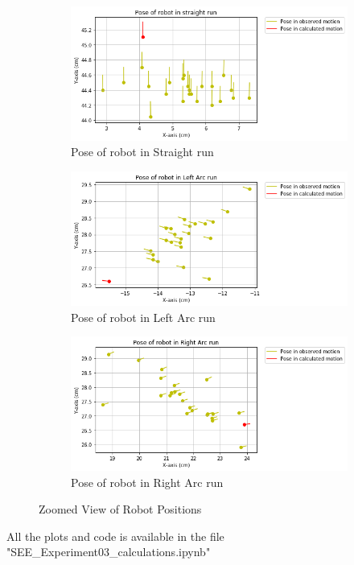 \documentclass[10pt,a4paper]{article}
\begin{document}
					 \begin{figure}[H]
						 	\begin{subfigure}{0.5\textwidth}
						 		\centering
						 		\includegraphics[width=0.8\linewidth]{img/scatter_plot_st.png}
						 		\caption{Pose of robot in Straight run}
						 	\end{subfigure}
						 	\hfill
						 	\begin{subfigure}{0.5\textwidth}
						 		\centering
						 		\includegraphics[width=0.8\linewidth]{img/scatter_plot_lt.png}
						 		\caption{Pose of robot in Left Arc run}
						 	\end{subfigure}
						 	\begin{subfigure}{0.5\textwidth}
						 		\centering
						 		\includegraphics[width=0.8\linewidth]{img/scatter_plot_rt.png}
						 		\caption{Pose of robot in Right Arc run}
						 	\end{subfigure}
						 	\caption{Zoomed View of Robot Positions}
				     \end{figure}	
				All the plots and code is available in the file "SEE\_Experiment03\_calculations.ipynb"\\
\end{document}
